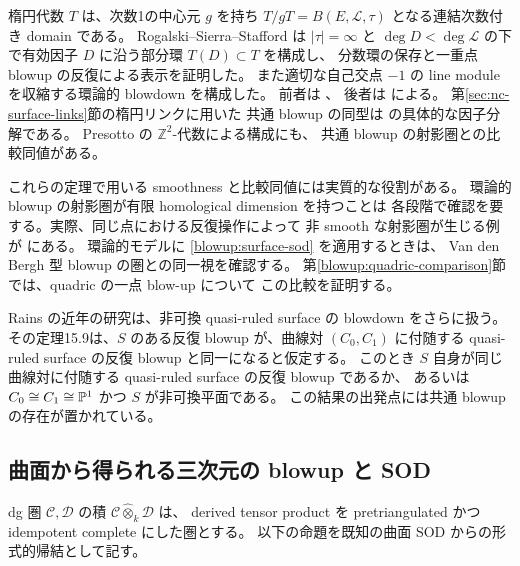 楕円代数 $T$ は、次数1の中心元 $g$ を持ち
$T/gT=B(E,\mathcal L,\tau)$ となる連結次数付き domain である。
Rogalski--Sierra--Stafford は $|\tau|=\infty$ と
$\deg D<\deg\mathcal L$ の下で有効因子 $D$ に沿う部分環 $T(D)\subset T$ を構成し、
分数環の保存と一重点 blowup の反復による表示を証明した。
また適切な自己交点 $-1$ の line module を収縮する環論的 blowdown を構成した。
前者は \cite[定理1.1、定理5.3、命題5.4]{BlowupRSS2015}、
後者は \cite[定理1.4、定理1.5]{BlowupRSS2017} による。
第\ref{sec:nc-surface-links}節の楕円リンクに用いた
共通 blowup の同型は \cite[定理1.2、定理7.3]{RSS2023} の具体的な因子分解である。
Presotto の $\mathbb Z^2$-代数による構成にも、
共通 blowup の射影圏との比較同値がある。
\cite[定理1.1]{BlowupPresotto2017}

これらの定理で用いる smoothness と比較同値には実質的な役割がある。
環論的 blowup の射影圏が有限 homological dimension を持つことは
各段階で確認を要する。実際、同じ点における反復操作によって
非 smooth な射影圏が生じる例が \cite[\S10]{BlowupRSS2017} にある。
環論的モデルに \eqref{blowup:surface-sod} を適用するときは、
Van den Bergh 型 blowup の圏との同一視を確認する。
第\ref{blowup:quadric-comparison}節では、quadric の一点 blow-up について
この比較を証明する。

Rains の近年の研究は、非可換 quasi-ruled surface の blowdown をさらに扱う。
その定理15.9は、$S$ のある反復 blowup が、曲線対 $(C_0,C_1)$ に付随する
quasi-ruled surface の反復 blowup と同一になると仮定する。
このとき $S$ 自身が同じ曲線対に付随する quasi-ruled surface の反復 blowup であるか、
あるいは $C_0\cong C_1\cong\mathbb P^1$ かつ $S$ が非可換平面である。
この結果の出発点には共通 blowup の存在が置かれている。
\cite[定理15.9]{BlowupRains2025}

\subsection{曲面から得られる三次元の blowup と SOD}
\label{blowup:product}

dg 圏 $\mathcal C,\mathcal D$ の積
$\mathcal C\widehat\otimes_k\mathcal D$ は、
derived tensor product を pretriangulated かつ idempotent complete にした圏とする。
以下の命題を既知の曲面 SOD からの形式的帰結として記す。

